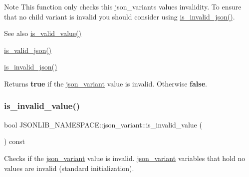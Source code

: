 \begin{DoxyNote}{Note}
This function only checks this json\+\_\+variants values invalidity. To ensure that no child variant is invalid you should consider using \hyperlink{classJSONLIB__NAMESPACE_1_1json__variant_a1a08b35da4cf3a334d32ebb81b20c08a}{is\+\_\+invalid\+\_\+json()}. 
\end{DoxyNote}
\begin{DoxySeeAlso}{See also}
\hyperlink{classJSONLIB__NAMESPACE_1_1json__variant_a224aab2dd56e3928dd893be8b7f3367a}{is\+\_\+valid\+\_\+value()} 

\hyperlink{classJSONLIB__NAMESPACE_1_1json__variant_a158e3148d9256af3d1b8251b2ca7b6c4}{is\+\_\+valid\+\_\+json()} 

\hyperlink{classJSONLIB__NAMESPACE_1_1json__variant_a1a08b35da4cf3a334d32ebb81b20c08a}{is\+\_\+invalid\+\_\+json()} 
\end{DoxySeeAlso}
\begin{DoxyReturn}{Returns}
{\bfseries true} if the \hyperlink{classJSONLIB__NAMESPACE_1_1json__variant}{json\+\_\+variant} value is invalid. Otherwise {\bfseries false}. 
\end{DoxyReturn}
\mbox{\label{classJSONLIB__NAMESPACE_1_1json__variant_ab6552a5e3de90ab1fbca078e5c245bfb}} 
\subsubsection{\texorpdfstring{is\+\_\+invalid\+\_\+value()}{is\_invalid\_value()}\hspace{0.1cm}{\footnotesize\ttfamily [2/2]}}
{\footnotesize\ttfamily bool J\+S\+O\+N\+L\+I\+B\+\_\+\+N\+A\+M\+E\+S\+P\+A\+C\+E\+::json\+\_\+variant\+::is\+\_\+invalid\+\_\+value (\begin{DoxyParamCaption}{ }\end{DoxyParamCaption}) const}



Checks if the \hyperlink{classJSONLIB__NAMESPACE_1_1json__variant}{json\+\_\+variant} value is invalid. \hyperlink{classJSONLIB__NAMESPACE_1_1json__variant}{json\+\_\+variant} variables that hold no values are invalid (standard initialization). 

